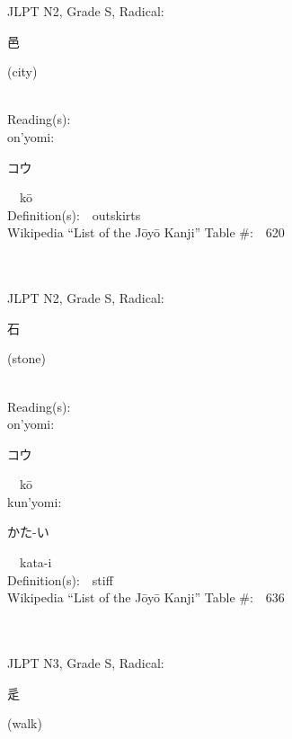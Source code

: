 \begin{multicols}{2}
{JLPT N2, Grade S, Radical:\ \ {\begin{CJK}{UTF8}{min} 邑 \end{CJK}} (city) } \\
Reading(s):\ \ \\
{\hspace*{1em}}on'yomi:\ \ \\
{\hspace*{2em}}{\begin{CJK}{UTF8}{min} コウ \end{CJK}}\ \ k\=o\ \ \\
Definition(s):\ \ outskirts \\
Wikipedia ``List of the J\=oy\=o Kanji'' Table \#:\ \ 620 \\
\ \ \\
{\fontsize{34pt}{40pt}  }\ \ \\  %
{JLPT N2, Grade S, Radical:\ \ {\begin{CJK}{UTF8}{min} 石 \end{CJK}} (stone) } \\
Reading(s):\ \ \\
{\hspace*{1em}}on'yomi:\ \ \\
{\hspace*{2em}}{\begin{CJK}{UTF8}{min} コウ \end{CJK}}\ \ k\=o\ \ \\
{\hspace*{1em}}kun'yomi:\ \ \\
{\hspace*{2em}}{\begin{CJK}{UTF8}{min} かた-い \end{CJK}}\ \ kata-i\ \ \\
Definition(s):\ \ stiff \\
Wikipedia ``List of the J\=oy\=o Kanji'' Table \#:\ \ 636 \\
\ \ \\
{\fontsize{34pt}{40pt}  }\ \ \\  %
{JLPT N3, Grade S, Radical:\ \ {\begin{CJK}{UTF8}{min} 辵 \end{CJK}} (walk) } \\

\end{multicols}
